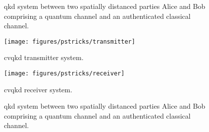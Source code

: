 \begin{figure}[htb]
	\centering
	
	\caption{\Gls{qkd} system between two spatially distanced parties Alice and Bob comprising a quantum channel and an authenticated classical channel.}
\end{figure}

\begin{figure}[htb]
	\centering
	\texttt{[image: figures/pstricks/transmitter]}
	\caption{\Gls{cvqkd} transmitter system.}
\end{figure}
\begin{figure}[htb]
	\centering
	\texttt{[image: figures/pstricks/receiver]}
	\caption{\Gls{cvqkd} receiver system.}
\end{figure}

\begin{figure}[htb]
	\centering
	
	\caption{\Gls{qkd} system between two spatially distanced parties Alice and Bob comprising a quantum channel and an authenticated classical channel.}
\end{figure}